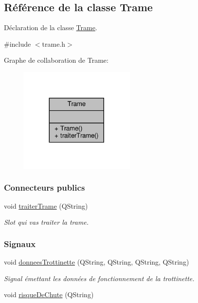 \hypertarget{class_trame}{}\subsection{Référence de la classe Trame}
\label{class_trame}


Déclaration de la classe \hyperlink{class_trame}{Trame}.  




{\ttfamily \#include $<$trame.\+h$>$}



Graphe de collaboration de Trame\+:\nopagebreak
\begin{figure}[H]
\begin{center}
\leavevmode
\includegraphics[width=164pt]{class_trame__coll__graph}
\end{center}
\end{figure}
\subsubsection*{Connecteurs publics}
\begin{DoxyCompactItemize}
\item 
void \hyperlink{class_trame_af6397dc6452101d13d8cccd53205a937}{traiter\+Trame} (Q\+String)
\begin{DoxyCompactList}\small\item\em Slot qui vas traiter la trame. \end{DoxyCompactList}\end{DoxyCompactItemize}
\subsubsection*{Signaux}
\begin{DoxyCompactItemize}
\item 
void \hyperlink{class_trame_ae7f5191744273a6bb4347aa477bdfaff}{donnees\+Trottinette} (Q\+String, Q\+String, Q\+String, Q\+String)
\begin{DoxyCompactList}\small\item\em Signal émettant les données de fonctionnement de la trottinette. \end{DoxyCompactList}\item 
void \hyperlink{class_trame_a8286aea8fb78e2e148f3f0dc35e8b079}{risque\+De\+Chute} (Q\+String)
\end{DoxyCompactItemize}
